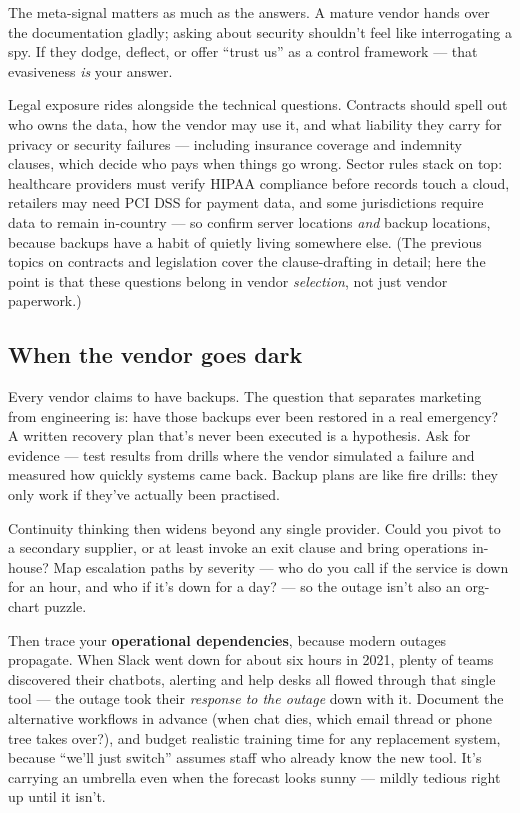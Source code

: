 The meta-signal matters as much as the answers. A mature vendor hands over the documentation gladly; asking about security shouldn't feel like interrogating a spy. If they dodge, deflect, or offer ``trust us'' as a control framework — that evasiveness \emph{is} your answer.


Legal exposure rides alongside the technical questions. Contracts should spell out who owns the data, how the vendor may use it, and what liability they carry for privacy or security failures — including insurance coverage and indemnity clauses, which decide who pays when things go wrong. Sector rules stack on top: healthcare providers must verify HIPAA compliance before records touch a cloud, retailers may need PCI DSS for payment data, and some jurisdictions require data to remain in-country — so confirm server locations \emph{and} backup locations, because backups have a habit of quietly living somewhere else. (The previous topics on contracts and legislation cover the clause-drafting in detail; here the point is that these questions belong in vendor \emph{selection}, not just vendor paperwork.)



\subsection{When the vendor goes dark}


Every vendor claims to have backups. The question that separates marketing from engineering is: have those backups ever been restored in a real emergency? A written recovery plan that's never been executed is a hypothesis. Ask for evidence — test results from drills where the vendor simulated a failure and measured how quickly systems came back. Backup plans are like fire drills: they only work if they've actually been practised.


Continuity thinking then widens beyond any single provider. Could you pivot to a secondary supplier, or at least invoke an exit clause and bring operations in-house? Map escalation paths by severity — who do you call if the service is down for an hour, and who if it's down for a day? — so the outage isn't also an org-chart puzzle.


Then trace your \textbf{operational dependencies}, because modern outages propagate. When Slack went down for about six hours in 2021, plenty of teams discovered their chatbots, alerting and help desks all flowed through that single tool — the outage took their \emph{response to the outage} down with it. Document the alternative workflows in advance (when chat dies, which email thread or phone tree takes over?), and budget realistic training time for any replacement system, because ``we'll just switch'' assumes staff who already know the new tool. It's carrying an umbrella even when the forecast looks sunny — mildly tedious right up until it isn't.



